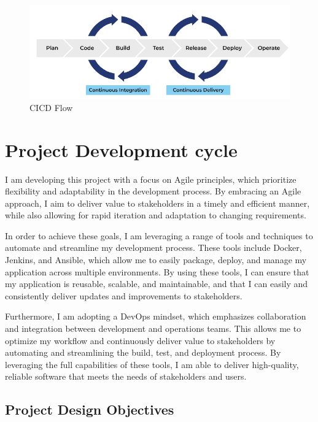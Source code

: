 \documentclass[
  10pt,
  paper=a4,
  ,captions=tableheading
]{scrartcl}
\begin{document}
\begin{figure}
\centering
\includegraphics{cicd.png}
\caption{CICD Flow}
\end{figure}

\hypertarget{project-development-cycle}{%
\section{Project Development cycle}\label{project-development-cycle}}

I am developing this project with a focus on Agile principles, which
prioritize flexibility and adaptability in the development process. By
embracing an Agile approach, I aim to deliver value to stakeholders in a
timely and efficient manner, while also allowing for rapid iteration and
adaptation to changing requirements.

In order to achieve these goals, I am leveraging a range of tools and
techniques to automate and streamline my development process. These
tools include Docker, Jenkins, and Ansible, which allow me to easily
package, deploy, and manage my application across multiple environments.
By using these tools, I can ensure that my application is reusable,
scalable, and maintainable, and that I can easily and consistently
deliver updates and improvements to stakeholders.

Furthermore, I am adopting a DevOps mindset, which emphasizes
collaboration and integration between development and operations teams.
This allows me to optimize my workflow and continuously deliver value to
stakeholders by automating and streamlining the build, test, and
deployment process. By leveraging the full capabilities of these tools,
I am able to deliver high-quality, reliable software that meets the
needs of stakeholders and users.

\hypertarget{project-design-objectives}{%
\subsection{Project Design Objectives}\label{project-design-objectives}}
\end{document}
